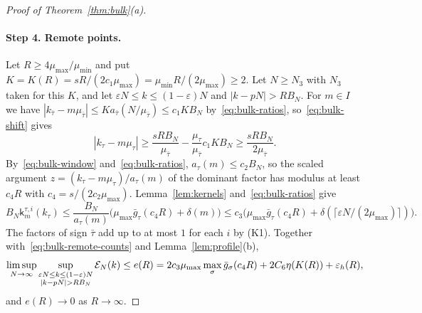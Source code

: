 \begin{proof}[Proof of Theorem~\ref{thm:bulk}(a)]
\paragraph{Step 4. Remote points.}
Let $R\ge4\mu_{\max}/\mu_{\min}$ and put $K=K(R)=sR/(2c_1\mu_{\max})=\mu_{\min}R/(2\mu_{\max})\ge2$.
Let $N\ge N_3$ with $N_3$ taken for this $K$, and let $\varepsilon N\le k\le(1-\varepsilon)N$
and $|k-pN|>RB_N$. For $m\in I$ we have
$|k_{\bar\tau}-m\mu_{\bar\tau}|\le Ka_{\bar\tau}(N/\mu_{\bar\tau})\le c_1KB_N$
by~\eqref{eq:bulk-ratios}, so~\eqref{eq:bulk-shift} gives
\[
 |k_\tau-m\mu_\tau|\ge\frac{sRB_N}{\mu_{\bar\tau}}-\frac{\mu_\tau}{\mu_{\bar\tau}}c_1KB_N
 \ge\frac{sRB_N}{2\mu_{\bar\tau}} .
\]
By~\eqref{eq:bulk-window} and~\eqref{eq:bulk-ratios}, $a_\tau(m)\le c_2B_N$, so the scaled
argument $z=(k_\tau-m\mu_\tau)/a_\tau(m)$ of the dominant factor has modulus at least
$c_4R$ with $c_4=s/(2c_2\mu_{\max})$. Lemma~\ref{lem:kernels} and~\eqref{eq:bulk-ratios}
give
\[
 B_N\mathsf k^{\tau,i}_m(k_\tau)\le\frac{B_N}{a_\tau(m)}\bigl(\mu_{\max}\bar g_\tau(c_4R)+\delta(m)\bigr)
 \le c_3\bigl(\mu_{\max}\bar g_\tau(c_4R)+\delta(\lceil\varepsilon N/(2\mu_{\max})\rceil)\bigr).
\]
The factors of sign $\bar\tau$ add up to at most $1$ for each $i$ by (K1). Together
with~\eqref{eq:bulk-remote-counts} and Lemma~\ref{lem:profile}(b),
\begin{equation}\label{eq:bulk-remote-points}
 \limsup_{N\to\infty}\sup_{\substack{\varepsilon N\le k\le(1-\varepsilon)N\\|k-pN|>RB_N}}\mathcal E_N(k)
 \le e(R)=2c_3\mu_{\max}\max_\sgn\bar g_\sgn(c_4R)+2C_6\eta(K(R))+\varepsilon_h(R),
\end{equation}
and $e(R)\to0$ as $R\to\infty$.


\end{proof}
